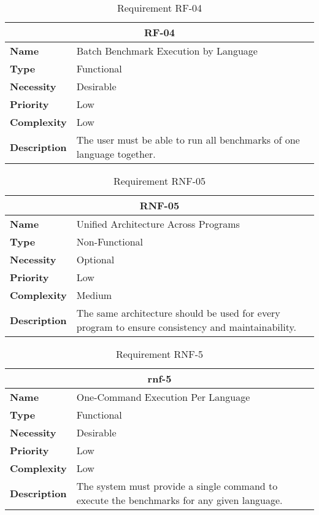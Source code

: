 \begin{table}[H]
    \centering
    \begin{tabular}{l p{10cm}}
        \toprule
        \multicolumn{2}{c}{\textbf{RF-04}} \\
        \toprule
        \textbf{Name}               & Batch Benchmark Execution by Language \\
        \textbf{Type}               & Functional \\
        \textbf{Necessity}          & Desirable \\
        \textbf{Priority}           & Low \\
        \textbf{Complexity}         & Low \\
        \textbf{Description}        & The user must be able to run all benchmarks of one language together. \\
        \bottomrule
    \end{tabular}
\caption{Requirement RF-04}\label{tab:rf-04}
\end{table}

\begin{table}[H]
    \centering
    \begin{tabular}{l p{10cm}}
        \toprule
        \multicolumn{2}{c}{\textbf{RNF-05}} \\
        \toprule
        \textbf{Name}         & Unified Architecture Across Programs \\
        \textbf{Type}         & Non-Functional \\
        \textbf{Necessity}    & Optional \\
        \textbf{Priority}     & Low \\
        \textbf{Complexity}   & Medium \\
        \textbf{Description}  & The same architecture should be used for every program to ensure consistency and maintainability. \\
        \bottomrule
    \end{tabular}
\caption{Requirement RNF-05}\label{tab:rnf-05}
\end{table}

\begin{table}[H]
    \centering
    \begin{tabular}{l p{10cm}}
        \toprule
        \multicolumn{2}{c}{\textbf{rnf-5}} \\
        \toprule
        \textbf{Name}         & One-Command Execution Per Language \\
        \textbf{Type}         & Functional \\
        \textbf{Necessity}    & Desirable \\
        \textbf{Priority}     & Low \\
        \textbf{Complexity}   & Low \\
        \textbf{Description}  & The system must provide a single command to execute the benchmarks for any given language. \\
        \bottomrule
    \end{tabular}
\caption{Requirement RNF-5}\label{tab:rnf-5}
\end{table}

